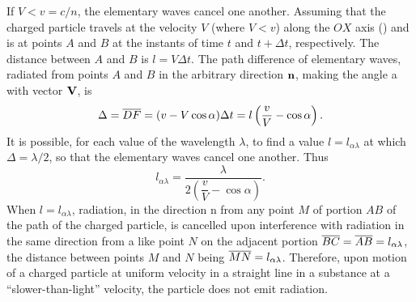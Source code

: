 If $V < v = c/n$, the elementary waves cancel one another.
Assuming that the charged particle travels at the velocity $V$
(where $V < v$) along the $OX$ axis () and is at points $A$ and $B$ at the instants of time $t$ and $t + \Delta t$, respectively. The distance between $A$ and $B$ is $l = V \Delta t$. The path difference of elementary waves, radiated from points $A$ and $B$ in the arbitrary direction $\vb{n}$, making the angle a with vector $\vb{V}$, is
\begin{equation*}%
\Delta = \seg{DF} = (v - V \cos \alpha) \Delta t = l \left( \dfrac{v}{V} - \cos \alpha \right).
\end{equation*}
It is possible, for each value of the wavelength $\lambda$, to find a value $l  = l_{\alpha \lambda}$ at which $\Delta = \lambda/2$, so that the elementary waves cancel
one another. Thus
\begin{equation*}%
l_{\alpha \lambda} = \frac{\lambda}{2 \left( \dfrac{v}{V} - \cos \alpha \right)}.
\end{equation*}
When $l = l_{\alpha \lambda}$, radiation, in the direction n from any point $M$ of portion $AB$ of the path of the charged particle, is cancelled upon interference with radiation in the same direction from a like point $N$ on the adjacent portion $\overline{BC} = \overline{AB} = l_{\alpha \lambda}$, the distance between points $M$ and $N$ being $\overline{MN} = l_{\alpha \lambda}$. Therefore, upon motion of a charged particle at uniform velocity in a straight line in a substance at a ``slower-than-light'' velocity, the particle does not emit radiation.

